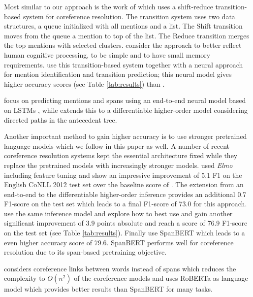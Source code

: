 \documentclass[11pt,a4paper]{article}
\begin{document}
Most similar to our approach is the work of  which uses a shift-reduce transition-based system for coreference resolution. The transition system uses two data structures, a queue initialized with all mentions and a list. The {\sc Shift} transition moves from the queue a mention to top of the list. The {\sc Reduce} transition merges the top mentions with selected clusters.  consider the approach to better reflect human cognitive processing, to be simple and to have small memory requirements.  use this transition-based system together with a neural approach for mention identification and transition prediction; this neural model \cite{xia-etal-2020-incremental} gives higher accuracy scores (see Table \ref{tab:results}) than . 

 focus on predicting mentions and spans using an end-to-end neural model based on LSTMs \cite{HochSchm97}, while  extends this to a differentiable higher-order model considering directed paths in the antecedent tree. 

Another important method to gain higher accuracy is to use stronger pretrained language models which we follow in this paper as well. A number of recent coreference resolution systems kept the essential architecture fixed while they replace the pretrained models with increasingly stronger models.  used {\em Elmo} \cite{peters-etal-2018-deep} including feature tuning and show an impressive improvement of 5.1 F1 on the English CoNLL 2012 test set over the baseline score of . The extension from an end-to-end to the differentiable higher-order inference provides an additional 0.7 F1-score on the test set which leads to a final F1-score of 73.0 for this approach.  use the same inference model and explore how to best use and gain another significant improvement of 3.9 points absolute and reach a score of 76.9 F1-score on the test set (see Table \ref{tab:results}). Finally  use SpanBERT which leads to a even higher accuracy score of 79.6. SpanBERT performs well for coreference resolution due to its span-based pretraining objective.

  considers coreference links between words instead of spans which reduces the complexity to $O(n^2)$ of the coreference models and uses RoBERTa as language model which provides better results than SpanBERT for many tasks.
 
\end{document}
